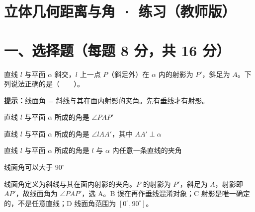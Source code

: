 \documentclass{exam-zh}
\begin{document}
\section*{立体几何距离与角 · 练习（教师版）}

\section*{一、选择题（每题 8 分，共 16 分）}


\begin{question}[points=8]
  \noindent
  \begin{minipage}[t]{\dimexpr\linewidth-70mm-6mm\relax}
    \vspace{0pt}
    直线 $l$ 与平面 $\alpha$ 斜交，$l$ 上一点 $P$（斜足外）在 $\alpha$ 内的射影为 $P'$，斜足为 $A$。下列说法正确的是（　　）。
    \begin{hintbox}
\textbf{提示：}线面角 = 斜线与其在面内射影的夹角。先有垂线才有射影。\end{hintbox}

    \par
    \begin{choices}[columns=1]
      \item 直线 $l$ 与平面 $\alpha$ 所成的角是 $\angle PAP'$
      \item 直线 $l$ 与平面 $\alpha$ 所成的角是 $\angle lAA'$，其中 $AA'\perp\alpha$
      \item 直线 $l$ 与平面 $\alpha$ 所成的角是 $l$ 与 $\alpha$ 内任意一条直线的夹角
      \item 线面角可以大于 $90^\circ$
    \end{choices}
  \end{minipage}\hfill
  \begin{diagramcoltikz}{70mm}{斜线 $l$、斜足 $A$、射影 $AP'$。}
  }
  \end{diagramcoltikz}
  \paren[A]
  \begin{solutionblock}
    线面角定义为斜线与其在面内射影的夹角。$P$ 的射影为 $P'$，斜足为 $A$，射影即 $AP'$，故线面角为 $\angle PAP'$，选 A。B 误在再作垂线混淆对象；C 射影是唯一确定的，不是任意直线；D 线面角范围为 $[0^\circ,90^\circ]$。
  \end{solutionblock}
\end{question}
\end{document}

